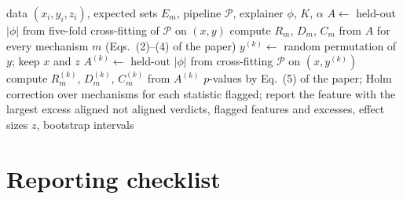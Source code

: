 \documentclass[10pt]{article}
\begin{document}
\begin{algorithm}[H]
\caption{Mechanism-level attribution audit}
\label{alg:audit}
\small
\begin{algorithmic}[1]
\REQUIRE data $(x_i,y_i,z_i)$, expected sets $E_m$, pipeline $\mathcal{P}$, explainer $\phi$, $K$, $\alpha$
\STATE $A\leftarrow$ held-out $|\phi|$ from five-fold cross-fitting of $\mathcal{P}$ on $(x,y)$
\STATE compute $R_m$, $D_m$, $C_m$ from $A$ for every mechanism $m$ (Eqs.~(2)--(4) of the paper)
\STATE $y^{(k)}\leftarrow$ random permutation of $y$; keep $x$ and $z$
\STATE $A^{(k)}\leftarrow$ held-out $|\phi|$ from cross-fitting $\mathcal{P}$ on $(x,y^{(k)})$
\STATE compute $R_m^{(k)}$, $D_m^{(k)}$, $C_m^{(k)}$ from $A^{(k)}$
\ENDFOR
\STATE $p$-values by Eq.~(5) of the paper; Holm correction over mechanisms for each statistic
\STATE flagged; report the feature with the largest excess
\STATE aligned
\ELSE
\STATE not aligned
\ENDIF
\ENDFOR
\ENSURE verdicts, flagged features and excesses, effect sizes $z$, bootstrap intervals
\end{algorithmic}
\end{algorithm}

\section{Reporting checklist}
\end{document}
